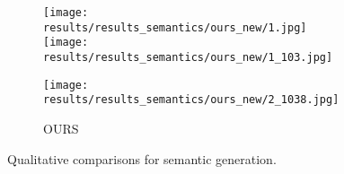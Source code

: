 \begin{figure}[t!]
\begin{subfigure}[t]{0.19\linewidth}
      \texttt{[image: results/results\_semantics/ours\_new/1.jpg]}
      \texttt{[image: results/results\_semantics/ours\_new/1\_103.jpg]}

      \texttt{[image: results/results\_semantics/ours\_new/2\_1038.jpg]}
      \caption{OURS}
    \end{subfigure}
    \vspace{-3mm}    
    \caption{Qualitative comparisons for semantic generation. }
    \label{fig:facesematic}
    \vspace{-2mm}
  \end{figure}